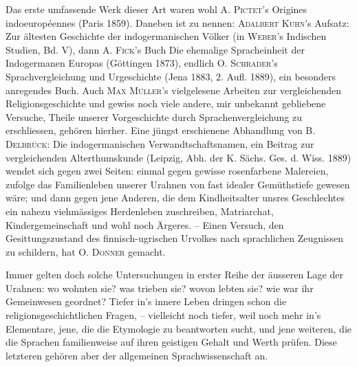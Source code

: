 {Das erste umfassende Werk dieser Art waren wohl A. \textsc{Pictet}’s Origines indoeuropéennes (Paris 1859). Daneben ist zu nennen: \textsc{Adalbert Kuhn}’s Aufsatz: Zur ältesten Geschichte der indogermanischen Völker (in \textsc{Weber}’s Indischen Studien, Bd. V), dann A. \textsc{Fick}’s Buch Die ehemalige Spracheinheit der Indogermanen Europas (Göttingen 1873), endlich O. \textsc{Schrader}’s Sprachvergleichung und Urgeschichte (Jena 1883, 2. Aufl. 1889), ein besonders anregendes Buch. Auch \textsc{Max Müller}’s vielgelesene Arbeiten zur vergleichenden Religionsgeschichte und gewiss noch viele andere, mir unbekannt gebliebene Versuche, Theile unserer Vorgeschichte durch Sprachenvergleichung zu erschliessen, gehören hierher. Eine jüngst erschienene Abhandlung von \textsc{B. Delbrück}: Die indogermanischen Verwandtschaftsnamen, ein Beitrag zur vergleichenden Alterthumskunde (Leipzig, Abh. der K. Sächs. Ges. d. Wiss. 1889) wendet sich gegen zwei Seiten: einmal gegen gewisse rosenfarbene Malereien,  zufolge das Familienleben unserer Urahnen von fast idealer Gemüthstiefe gewesen wäre; und dann gegen jene Anderen, die dem Kindheitsalter unsres Geschlechtes ein nahezu viehmässiges Herdenleben zuschreiben, Matriarchat, Kindergemeinschaft und wohl noch Ärgeres.  – Einen Versuch, den Gesittungszustand des finnisch-ugrischen Urvolkes nach sprachlichen Zeugnissen zu schildern, hat \textsc{O. Donner} gemacht.

\largerpage[2]Immer gelten doch solche Untersuchungen in erster Reihe der äusseren Lage der Urahnen: wo wohnten sie? was trieben sie? wovon lebten sie? wie war ihr Gemeinwesen geordnet? Tiefer in’s innere Leben dringen schon die religionsgeschichtlichen Fragen, – vielleicht noch tiefer, weil noch mehr in’s Elementare, jene, die die Etymologie zu beantworten sucht, und jene weiteren, die die Sprachen familienweise auf \label{fp.289} ihren geistigen Gehalt und Werth prüfen. Diese letzteren gehören aber der allgemeinen Sprachwissenschaft an.

}
